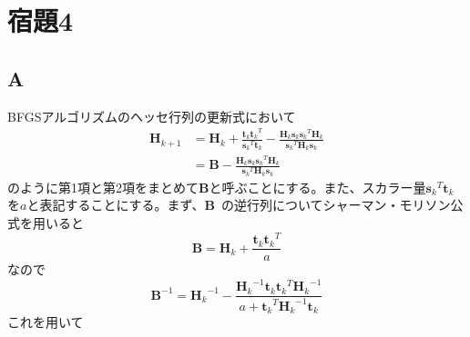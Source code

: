 \documentclass[10pt,a4paper]{ltjsarticle}       %
\begin{document}
    \section{宿題4}
    \subsection{A}
    BFGSアルゴリズムのヘッセ行列の更新式において
    \begin{align}
    \bm{H}_{k+1} &= \bm{H}_k + \frac{\bm{t}_k {\bm{t}_k}^T}{{\bm{s}_k}^T \bm{t}_k} - \frac{\bm{H}_k\bm{s}_k {\bm{s}_k}^T\bm{H}_k}{{\bm{s}_k}^T\bm{H}_k\bm{s}_k} \\
    &= \bm{B} - \frac{\bm{H}_k\bm{s}_k {\bm{s}_k}^T\bm{H}_k}{{\bm{s}_k}^T\bm{H}_k\bm{s}_k}
    \end{align}
    のように第1項と第2項をまとめて$\bm{B}$と呼ぶことにする。また、スカラー量${\bm{s}_k}^T \bm{t}_k$を$a$と表記することにする。まず、$\bm{B}$ の逆行列についてシャーマン・モリソン公式を用いると
    \begin{equation}
    \bm{B} = \bm{H}_k + \frac{\bm{t}_k {\bm{t}_k}^T} {a}
    \end{equation}
    なので
    \begin{equation}
    \bm{B}^{-1} = {\bm{H}_k}^{-1} - \frac{
      {\bm{H}_k}^{-1}\bm{t}_k{\bm{t}_k}^T{\bm{H}_k}^{-1}
    }{
      a + {\bm{t}_k}^T{\bm{H}_k}^{-1}\bm{t}_k
    }
    \end{equation}
    これを用いて
\end{document}
